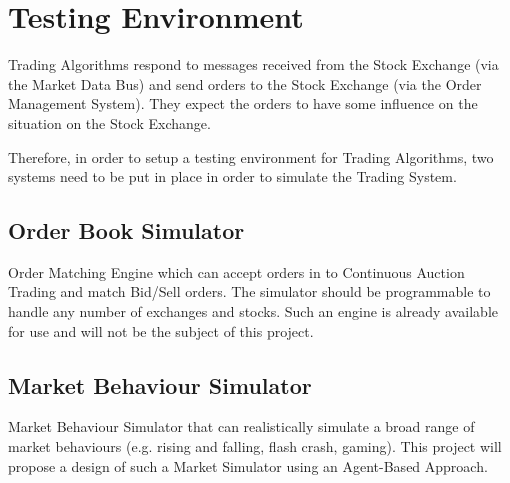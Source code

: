\section{Testing Environment}


Trading Algorithms respond to messages received from the Stock Exchange (via the Market Data Bus) and send orders to the Stock Exchange (via the Order Management System). They expect the orders to have some influence on the situation on the Stock Exchange. 

Therefore, in order to setup a testing environment for Trading Algorithms, two systems need to be put in place in order to simulate the Trading System.

\subsection{Order Book Simulator}
Order Matching Engine which can accept orders in to Continuous Auction Trading and match Bid/Sell orders. The simulator should be programmable to handle any number of exchanges and stocks. Such an engine is already available for use and will not be the subject of this project.

\subsection{Market Behaviour Simulator}
Market Behaviour Simulator that can realistically simulate a broad range of market behaviours (e.g. rising and falling, flash crash, gaming). This project will propose a design of such a Market Simulator using an Agent-Based Approach.
